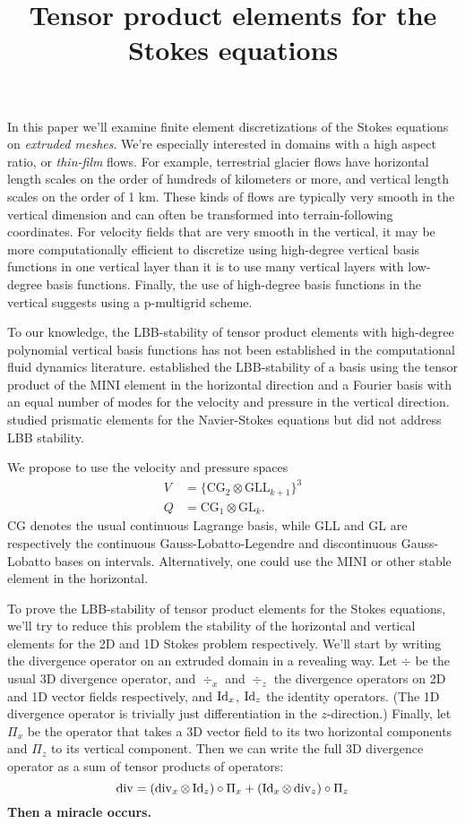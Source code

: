 \documentclass{article}
\title{Tensor product elements for the Stokes equations}
\author{}
\date{}
\theoremstyle{definition}
\theoremstyle{plain}
\renewcommand{\div}[1]{\operatorname{div} #1} %
\newcommand{\Id}[1]{\operatorname{Id} #1}
\begin{document}
\maketitle

In this paper we'll examine finite element discretizations of the Stokes equations on \emph{extruded meshes}.
We're especially interested in domains with a high aspect ratio, or \emph{thin-film} flows.
For example, terrestrial glacier flows have horizontal length scales on the order of hundreds of kilometers or more, and vertical length scales on the order of 1 km.
These kinds of flows are typically very smooth in the vertical dimension and can often be transformed into terrain-following coordinates.
For velocity fields that are very smooth in the vertical, it may be more computationally efficient to discretize using high-degree vertical basis functions in one vertical layer than it is to use many vertical layers with low-degree basis functions.
Finally, the use of high-degree basis functions in the vertical suggests using a p-multigrid scheme.

To our knowledge, the LBB-stability of tensor product elements with high-degree polynomial vertical basis functions has not been established in the computational fluid dynamics literature.
\citet{canuto1984combined} established the LBB-stability of a basis using the tensor product of the MINI element in the horizontal direction and a Fourier basis with an equal number of modes for the velocity and pressure in the vertical direction.
\citet{nakahashi1989finite} studied prismatic elements for the Navier-Stokes equations but did not address LBB stability.

We propose to use the velocity and pressure spaces
\begin{align}
    V & = \{\text{CG}_2 \otimes \text{GLL}_{k + 1}\}^3 \\
    Q & = \text{CG}_1 \otimes \text{GL}_k.
\end{align}
CG denotes the usual continuous Lagrange basis, while GLL and GL are respectively the continuous Gauss-Lobatto-Legendre and discontinuous Gauss-Lobatto bases on intervals.
Alternatively, one could use the MINI or other stable element in the horizontal.

To prove the LBB-stability of tensor product elements for the Stokes equations, we'll try to reduce this problem the stability of the horizontal and vertical elements for the 2D and 1D Stokes problem respectively.
We'll start by writing the divergence operator on an extruded domain in a revealing way.
Let $\div$ be the usual 3D divergence operator, and $\div_x$ and $\div_z$ the divergence operators on 2D and 1D vector fields respectively, and $\Id_x$, $\Id_z$ the identity operators.
(The 1D divergence operator is trivially just differentiation in the $z$-direction.)
Finally, let $\Pi_x$ be the operator that takes a 3D vector field to its two horizontal components and $\Pi_z$ to its vertical component.
Then we can write the full 3D divergence operator as a sum of tensor products of operators:
\begin{equation}
    \div = (\div_x \otimes \Id_z)\circ\Pi_x + (\Id_x \otimes \div_z)\circ\Pi_z
\end{equation}
\textbf{Then a miracle occurs.}
\end{document}
